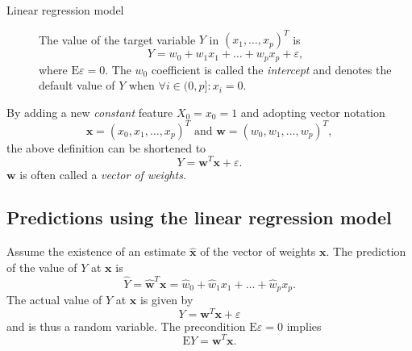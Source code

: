 \documentclass[a4paper]{article}
\begin{document}
	\begin{description}
		\item[Linear regression model] The value of the target variable $Y$ in
			$(x_1, \ldots, x_p)^T$ is \[
				Y = w_0 + w_1x_1 + \ldots + w_p x_p + \varepsilon
			,\] where $\mathrm{E}\varepsilon = 0$.
			The $w_0$ coefficient is called the \textit{intercept} and denotes the
			default value of $Y$ when $\forall i \in (0, p]: x_i = 0$.
	\end{description}

	By adding a new \textit{constant} feature $X_0 = x_0 = 1$ and adopting vector
	notation \[
		\boldsymbol{x} = (x_0, x_1, \ldots, x_p)^T
		\text{ and }
		\boldsymbol{w} = (w_0, w_1, \ldots, w_p)^T
	,\] the above definition can be shortened to \[
		Y = \boldsymbol{w}^T\boldsymbol{x} + \varepsilon
	.\] $\boldsymbol{w}$ is often called a \textit{vector of weights}.

	\subsection{Predictions using the linear regression model}
	Assume the existence of an estimate $\hat{\boldsymbol{x}}$ of the vector of weights
	$\boldsymbol{x}$. The prediction of the value of $Y$ at $\boldsymbol{x}$ is \[
		\hat{Y} = \hat{\boldsymbol{w}}^T \boldsymbol{x}
		  = \hat{w}_0 + \hat{w}_1 x_1 + \ldots + \hat{w}_p x_p
	.\] The actual value of $Y$ at $\boldsymbol{x}$ is given by \[
		Y = \boldsymbol{w}^T \boldsymbol{x} + \varepsilon
	\] and is thus a random variable. The precondition $\mathrm{E}\varepsilon = 0$
	implies \[
		\mathrm{E}Y = \boldsymbol{w}^T \boldsymbol{x}
	.\]
\end{document}
